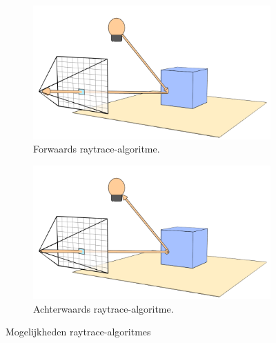 \begin{figure}
  \centering
  \begin{subfigure}[b]{0.45\textwidth}
    \includegraphics[width=\textwidth]{./img/raw/rt-forward/forward.png}
    \caption{Forwaards raytrace-algoritme.}
    \label{fig:rt-forward:forward}
  \end{subfigure}\quad%
  \begin{subfigure}[b]{0.45\textwidth}
    \includegraphics[width=\textwidth]{./img/raw/rt-forward/backward.png}
    \caption{Achterwaards raytrace-algoritme.}
    \label{fig:rt-forward:backward}
  \end{subfigure}%
  \caption{Mogelijkheden raytrace-algoritmes}
  \label{fig:rt-forward}
\end{figure}
